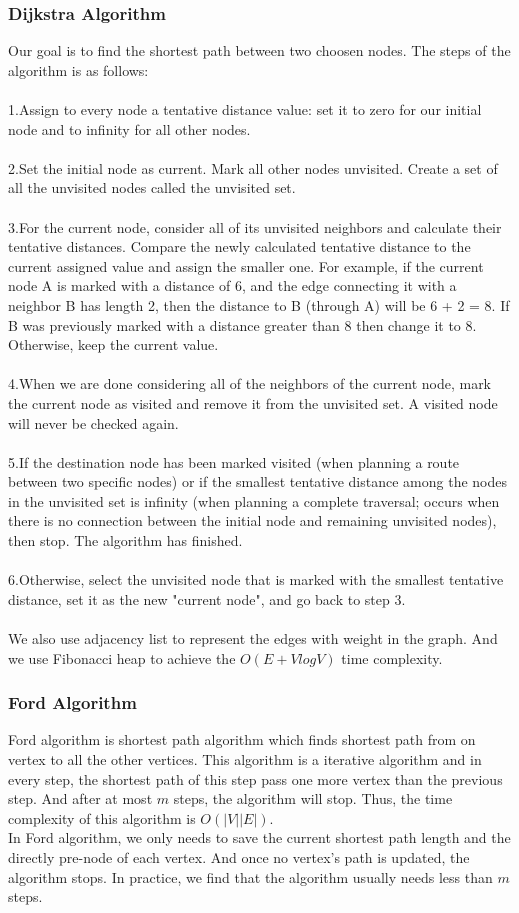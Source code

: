 \documentclass{article}
\begin{document}
\subsubsection{Dijkstra Algorithm}
Our goal is to find the shortest path between two choosen nodes. The steps of the algorithm is as follows:\\\\
1.Assign to every node a tentative distance value: set it to zero for our initial node and to infinity for all other nodes.\\\\
2.Set the initial node as current. Mark all other nodes unvisited. Create a set of all the unvisited nodes called the unvisited set.\\\\
3.For the current node, consider all of its unvisited neighbors and calculate their tentative distances. Compare the newly calculated tentative distance to the current assigned value and assign the smaller one. For example, if the current node A is marked with a distance of 6, and the edge connecting it with a neighbor B has length 2, then the distance to B (through A) will be 6 + 2 = 8. If B was previously marked with a distance greater than 8 then change it to 8. Otherwise, keep the current value.\\\\
4.When we are done considering all of the neighbors of the current node, mark the current node as visited and remove it from the unvisited set. A visited node will never be checked again.\\\\
5.If the destination node has been marked visited (when planning a route between two specific nodes) or if the smallest tentative distance among the nodes in the unvisited set is infinity (when planning a complete traversal; occurs when there is no connection between the initial node and remaining unvisited nodes), then stop. The algorithm has finished.\\\\
6.Otherwise, select the unvisited node that is marked with the smallest tentative distance, set it as the new "current node", and go back to step 3.\\\\
We also use adjacency list to represent the edges with weight in the graph. And we use Fibonacci heap to achieve the $O(E + VlogV)$ time complexity.
\subsubsection{Ford Algorithm}
Ford algorithm is shortest path algorithm which finds shortest path from on vertex to all the other vertices. This algorithm is a iterative algorithm and in every step, the shortest path of this step pass one more vertex than the previous step. And after at most $m$ steps, the algorithm will stop. Thus, the time complexity of this algorithm is $O(|V||E|)$.\\
In Ford algorithm, we only needs to save the current shortest path length and the directly pre-node of each vertex. And once no vertex's path is updated, the algorithm stops. In practice, we find that the algorithm usually needs less than $m$ steps.\\
\end{document}
